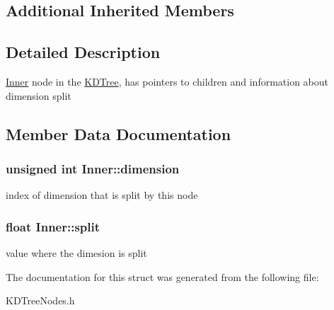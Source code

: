 \subsection*{Additional Inherited Members}


\subsection{Detailed Description}
\hyperlink{structInner}{Inner} node in the \hyperlink{classKDTree}{K\-D\-Tree}, has pointers to children and information about dimension split 

\subsection{Member Data Documentation}
\hypertarget{structInner_a2d01fc8187c7f779dda5196d4c432ff6}{
\subsubsection[{dimension}]{\setlength{\rightskip}{0pt plus 5cm}unsigned int Inner\-::dimension}}\label{structInner_a2d01fc8187c7f779dda5196d4c432ff6}
index of dimension that is split by this node \hypertarget{structInner_acef895531f508e188a51d132ef18e68f}{
\subsubsection[{split}]{\setlength{\rightskip}{0pt plus 5cm}float Inner\-::split}}\label{structInner_acef895531f508e188a51d132ef18e68f}
value where the dimesion is split 

The documentation for this struct was generated from the following file\-:\begin{DoxyCompactItemize}
\item 
K\-D\-Tree\-Nodes.\-h\end{DoxyCompactItemize}
